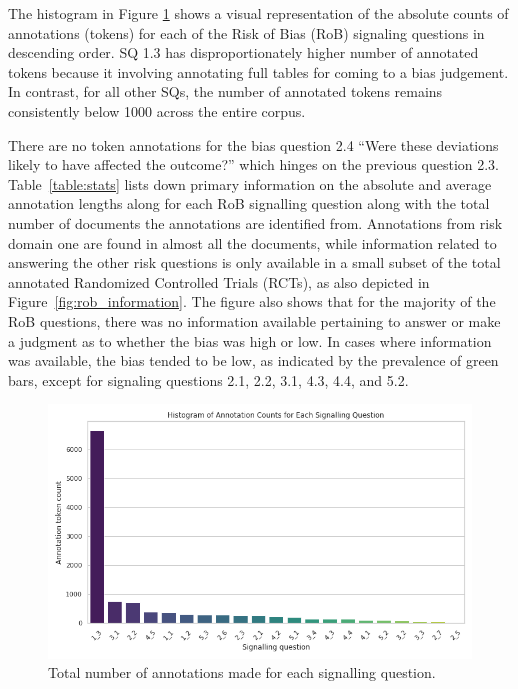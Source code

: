 \documentclass[sn-mathphys,Numbered]{sn-jnl}%
\theoremstyle{thmstyleone}%
\theoremstyle{thmstyletwo}%
\theoremstyle{thmstylethree}%
\begin{document}
The histogram in Figure \ref{fig:ann_counts} shows a visual representation of the absolute counts of annotations (tokens) for each of the Risk of Bias (RoB) signaling questions in descending order.
SQ 1.3 has disproportionately higher number of annotated tokens because it involving annotating full tables for coming to a bias judgement.
In contrast, for all other SQs, the number of annotated tokens remains consistently below 1000 across the entire corpus.

 
There are no token annotations for the bias question 2.4 ``Were these deviations likely to have affected the outcome?'' which hinges on the previous question 2.3.
Table~\ref{table:stats} lists down primary information on the absolute and average annotation lengths along for each RoB signalling question along with the total number of documents the annotations are identified from.
Annotations from risk domain one are found in almost all the documents, while information related to answering the other risk questions is only available in a small subset of the total annotated Randomized Controlled Trials (RCTs), as also depicted in Figure~\ref{fig:rob_information}.
The figure also shows that for the majority of the RoB questions, there was no information available pertaining to answer or make a judgment as to whether the bias was high or low.
In cases where information was available, the bias tended to be low, as indicated by the prevalence of green bars, except for signaling questions 2.1, 2.2, 3.1, 4.3, 4.4, and 5.2.
%
%
%
\begin{figure}[htb]
    \centering
    \includegraphics[width=0.60\columnwidth]{figures/sq_ann_raw_counts.png}
    \caption{Total number of annotations made for each signalling question.}
    \label{fig:ann_counts}
\end{figure}
%
%
%
\end{document}
